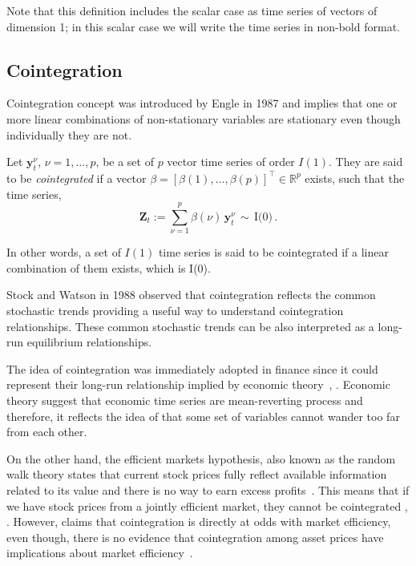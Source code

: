 Note that this definition includes the scalar case as time series of
vectors of dimension 1; in this scalar case we will write the time series in
non-bold format.


\subsection{Cointegration} \label{sec:coint}
Cointegration concept was introduced by Engle in 1987 \cite{engle1987} and implies that one or
more linear combinations of non-stationary variables are stationary even though
individually they are not.  

Let $\mathbf{y}_t^\nu$, $\nu=1,\dots,p$, be a set of $p$ vector time series of
order $I(1)$.  They are said to be {\em cointegrated\/} if a vector
$\beta=[\beta(1),\dots,\beta(p)]^\top \in \mathbb{R}^p$ exists, such that the
time series,
\begin{equation}
\mathbf{Z}_t:= 
\sum_{\nu=1}^p \beta(\nu)\,\mathbf{y}_t^\nu\,\sim\,\text{I(0)}\,.
\end{equation}

In other words, a set of $I(1)$ time series is said to be cointegrated if a
linear combination of them exists, which is I(0).

Stock and Watson in 1988 \cite{stock+watson1988} observed that
cointegration reflects the common stochastic trends providing a useful way to
understand cointegration relationships. These common stochastic trends can be
also interpreted as a long-run equilibrium relationships.

The idea of cointegration was immediately adopted in finance since it could
represent their long-run relationship implied by economic
theory~\cite{laietAl1991}, \cite{lence+falk2005}.  Economic theory suggest that
economic time series are mean-reverting process and therefore, it reflects the
idea of that some set of variables cannot wander too far from each other. 

On the other hand, the efficient markets hypothesis, also known as the random
walk theory states that current stock prices fully reflect available information
related to its value and there is no way to earn excess profits~\cite{fama1970}.
This means that if we have stock prices from a jointly efficient market, they
cannot be cointegrated \cite{granger1986}, \cite{dwyer1992}. However,
\cite{richards1995} claims that cointegration is directly at odds with market
efficiency, even though, there is no evidence that cointegration among asset
prices have implications about market efficiency~\cite{lence+falk2005}.

